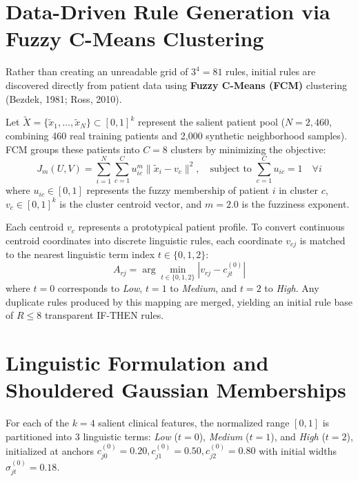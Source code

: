 \documentclass{report}
\begin{document}
\section{Data-Driven Rule Generation via Fuzzy C-Means Clustering}

Rather than creating an unreadable grid of $3^4 = 81$ rules, initial rules are discovered directly from patient data using \textbf{Fuzzy C-Means (FCM)} clustering (Bezdek, 1981; Ross, 2010).

Let $\tilde{X} = \{\tilde{x}_1, \dots, \tilde{x}_N\} \subset [0, 1]^k$ represent the salient patient pool ($N = 2{,}460$, combining 460 real training patients and 2,000 synthetic neighborhood samples). FCM groups these patients into $C = 8$ clusters by minimizing the objective:
\begin{equation}
    J_m(U, V) = \sum_{i=1}^N \sum_{c=1}^C u_{ic}^m \|\tilde{x}_i - v_c\|^2, \quad \text{subject to } \sum_{c=1}^C u_{ic} = 1 \quad \forall i
\end{equation}
where $u_{ic} \in [0, 1]$ represents the fuzzy membership of patient $i$ in cluster $c$, $v_c \in [0, 1]^k$ is the cluster centroid vector, and $m = 2.0$ is the fuzziness exponent.

Each centroid $v_c$ represents a prototypical patient profile. To convert continuous centroid coordinates into discrete linguistic rules, each coordinate $v_{cj}$ is matched to the nearest linguistic term index $t \in \{0, 1, 2\}$:
\begin{equation}
    A_{rj} = \arg\min_{t \in \{0, 1, 2\}} |v_{rj} - c_{jt}^{(0)}|
\end{equation}
where $t=0$ corresponds to \textit{Low}, $t=1$ to \textit{Medium}, and $t=2$ to \textit{High}. Any duplicate rules produced by this mapping are merged, yielding an initial rule base of $R \le 8$ transparent IF-THEN rules.

\section{Linguistic Formulation and Shouldered Gaussian Memberships}

For each of the $k=4$ salient clinical features, the normalized range $[0, 1]$ is partitioned into 3 linguistic terms: \textit{Low} ($t=0$), \textit{Medium} ($t=1$), and \textit{High} ($t=2$), initialized at anchors $c_{j0}^{(0)} = 0.20, c_{j1}^{(0)} = 0.50, c_{j2}^{(0)} = 0.80$ with initial widths $\sigma_{jt}^{(0)} = 0.18$.
\end{document}
